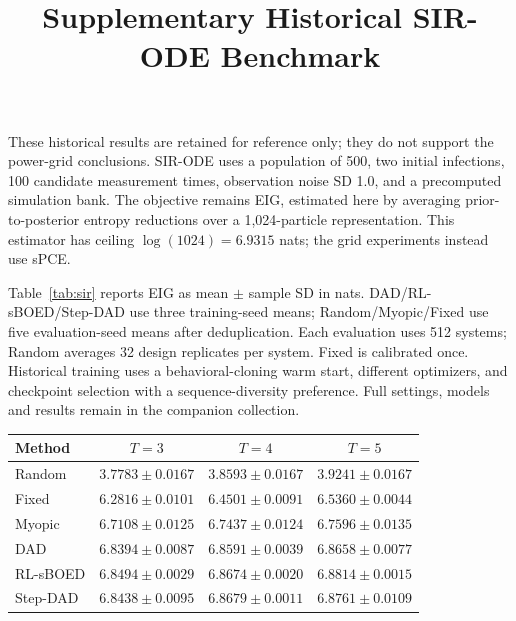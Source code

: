 \documentclass[10pt]{article}
\title{Supplementary Historical SIR-ODE Benchmark}
\author{}
\date{}
\newcommand{\papertablestyle}{\centering\small\setlength{\tabcolsep}{3pt}\renewcommand{\arraystretch}{1.05}}
\begin{document}
\maketitle
These historical results are retained for reference only; they do not
support the power-grid conclusions. SIR-ODE uses a population of 500,
two initial infections, 100 candidate measurement times, observation
noise SD 1.0, and a precomputed simulation bank. The objective remains
EIG, estimated here by averaging prior-to-posterior entropy reductions
over a 1,024-particle representation. This estimator has ceiling
$\log(1024)=6.9315$ nats; the grid experiments instead use sPCE.

Table~\ref{tab:sir} reports EIG as mean $\pm$ sample SD in nats.
DAD/RL-sBOED/Step-DAD use three training-seed means; Random/Myopic/Fixed
use five evaluation-seed means after deduplication. Each evaluation
uses 512 systems; Random averages 32 design replicates per system.
Fixed is calibrated once. Historical training uses a behavioral-cloning
warm start, different optimizers, and checkpoint selection with a
sequence-diversity preference. Full settings, models and results remain
in the companion collection.
\par\medskip\noindent\begin{minipage}{\columnwidth}\makeatletter{}\makeatother\caption{SIR-ODE EIG}\label{tab:sir}\papertablestyle
\begin{tabular*}{\columnwidth}{@{\extracolsep{\fill}}lccc@{}}\toprule Method & $T=3$ & $T=4$ & $T=5$\\\midrule
Random & $3.7783\pm0.0167$ & $3.8593\pm0.0167$ & $3.9241\pm0.0167$\\
Fixed & $6.2816\pm0.0101$ & $6.4501\pm0.0091$ & $6.5360\pm0.0044$\\
Myopic & $6.7108\pm0.0125$ & $6.7437\pm0.0124$ & $6.7596\pm0.0135$\\
DAD & $6.8394\pm0.0087$ & $6.8591\pm0.0039$ & $6.8658\pm0.0077$\\
RL-sBOED & $6.8494\pm0.0029$ & $6.8674\pm0.0020$ & $6.8814\pm0.0015$\\
Step-DAD & $6.8438\pm0.0095$ & $6.8679\pm0.0011$ & $6.8761\pm0.0109$\\
\bottomrule\end{tabular*}\end{minipage}\par\medskip
\end{document}

